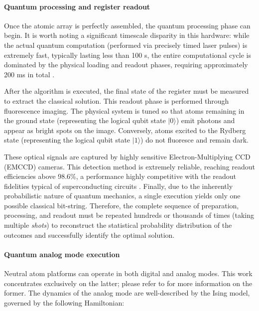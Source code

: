 \paragraph{Quantum processing and register readout}

Once the atomic array is perfectly assembled, the quantum processing phase can begin. It is worth noting a significant timescale disparity in this hardware: while the actual quantum computation (performed via precisely timed laser pulses) is extremely fast, typically lasting less than 100 \textmu s, the entire computational cycle is dominated by the physical loading and readout phases, requiring approximately 200 ms in total \cite{Henriet2020quantumcomputing}.

After the algorithm is executed, the final state of the register must be measured to extract the classical solution. This readout phase is performed through fluorescence imaging. The physical system is tuned so that atoms remaining in the ground state (representing the logical qubit state $|0\rangle$) emit photons and appear as bright spots on the image. Conversely, atoms excited to the Rydberg state (representing the logical qubit state $|1\rangle$) do not fluoresce and remain dark. 

These optical signals are captured by highly sensitive Electron-Multiplying CCD (EMCCD) cameras. This detection method is extremely reliable, reaching readout efficiencies above 98.6\%, a performance highly competitive with the readout fidelities typical of superconducting circuits \cite{Henriet2020quantumcomputing}. Finally, due to the inherently probabilistic nature of quantum mechanics, a single execution yields only one possible classical bit-string. Therefore, the complete sequence of preparation, processing, and readout must be repeated hundreds or thousands of times (taking multiple \textit{shots}) to reconstruct the statistical probability distribution of the outcomes and successfully identify the optimal solution.

\paragraph{Quantum analog mode execution}

Neutral atom platforms can operate in both digital and analog modes. This work concentrates exclusively on the latter; please refer to \cite{Henriet2020quantumcomputing} for more information on the former. The dynamics of the analog mode are well-described by the Ising model, governed by the following Hamiltonian:

